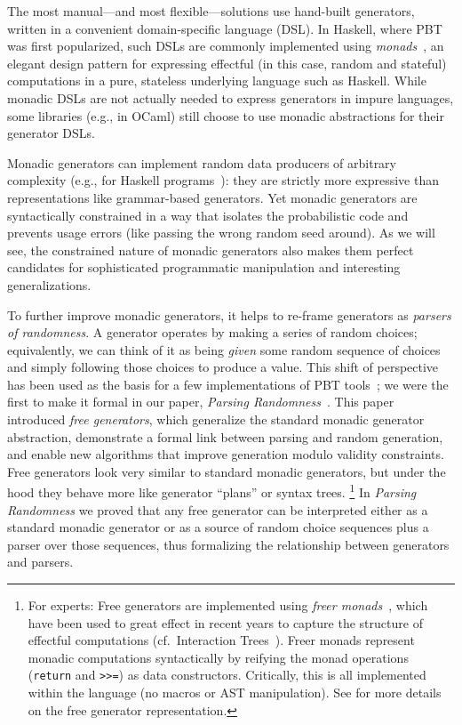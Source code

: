 The most manual---and most flexible---solutions use hand-built
generators, written in a convenient domain-specific language (DSL).
In  Haskell, where PBT was
first popularized, such DSLs are commonly implemented using {\em
monads\/}~\cite{moggi1991notions}, an elegant design pattern for
expressing effectful (in this case, random and stateful) computations
in a pure, stateless underlying
language such as Haskell. While monadic DSLs are not actually
needed to express generators in
impure languages, some libraries (e.g., in OCaml) still choose to use monadic
abstractions for their generator DSLs.

Monadic generators can implement random data producers of arbitrary complexity
(e.g., for Haskell
programs~\cite{palka_testing_2011}): they are strictly more expressive than
representations like grammar-based generators.  Yet monadic generators are
syntactically constrained in a way that isolates the probabilistic code and
prevents usage errors (like passing the wrong random seed around). As we will
see, the constrained nature of monadic generators also makes them perfect
candidates for sophisticated programmatic manipulation and interesting
generalizations.

To further improve monadic generators, it helps to re-frame generators as {\em
  parsers of randomness}. A generator
operates by making a series of random choices; equivalently, we can think of
it as being {\em given} some random sequence of choices and simply following
those choices to produce a value. This shift of perspective has been
used as the basis for a few implementations of PBT
tools~\cite{maciver2019hypothesis, dolan2017testing}; we were the
first to make it
formal in our paper, {\em Parsing Randomness}~\cite{goldstein2022parsing}.
%
This paper introduced {\em free generators}, which generalize the standard
monadic generator abstraction, demonstrate a formal link between parsing and
random generation, and enable new algorithms that improve
generation modulo validity constraints. Free generators look very
similar to standard monadic generators, but under the hood they behave more like
generator ``plans'' or syntax trees.%
\footnote{\normalsize For experts: Free generators are implemented using {\em freer
monads}~\cite{kiselyov2015freer}, which have been used to great effect in recent
years to capture the structure of effectful computations
(cf.~Interaction Trees~\cite{old:xia2019interaction}). Freer monads represent
monadic computations syntactically by reifying the monad operations
(\lstinline{return} and \lstinline{>>=}) as data constructors. Critically, this
is all implemented within the language (no macros or AST
manipulation). See \cite{goldstein2022parsing} for more details on the
free generator representation.}
In {\em Parsing Randomness} we proved that any free
generator can be interpreted
either as a standard monadic generator or as a source of
random choice sequences plus a parser over those sequences, thus formalizing the
relationship between generators and parsers.

